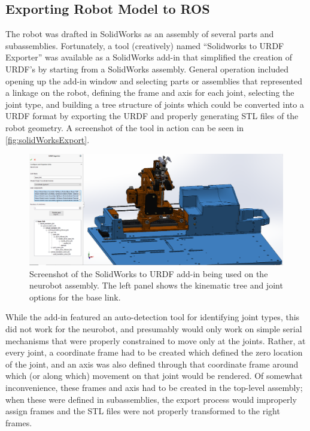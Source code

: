 \documentclass[12pt]{report}
\begin{document}
\subsection{Exporting Robot Model to ROS}
The robot was drafted in SolidWorks as an assembly of several parts and subassemblies. Fortunately, a tool (creatively) named ``Solidworks to URDF Exporter'' was available as a SolidWorks add-in that simplified the creation of URDF's by starting from a SolidWorks assembly. \cite{urdfExporter} General operation included opening up the add-in window and selecting parts or assemblies that represented a linkage on the robot, defining the frame and axis for each joint, selecting the joint type, and building a tree structure of joints which could be converted into a URDF format by exporting the URDF and properly generating STL files of the robot geometry. A screenshot of the tool in action can be seen in \autoref{fig:solidWorksExport}.

\begin{figure}[thpb]
	\centering
	\includegraphics[width=\textwidth]{images/solidworks_to_urdf_screenshot.PNG}
    \caption{Screenshot of the SolidWorks to URDF add-in being used on the neurobot assembly. The left panel shows the kinematic tree and joint options for the base link.}
    \label{fig:solidWorksExport}
\end{figure}

While the add-in featured an auto-detection tool for identifying joint types, this did not work for the neurobot, and presumably would only work on simple serial mechanisms that were properly constrained to move only at the joints. Rather, at every joint, a coordinate frame had to be created which defined the zero location of the joint, and an axis was also defined through that coordinate frame around which (or along which) movement on that joint would be rendered. Of somewhat inconvenience, these frames and axis had to be created in the top-level assembly; when these were defined in subassemblies, the export process would improperly assign frames and the STL files were not properly transformed to the right frames.
\end{document}
